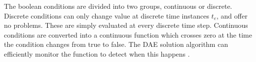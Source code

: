 \documentclass[\rootfolder/main.tex]{subfiles}
\begin{document}
The boolean conditions are divided into two groups, continuous or discrete.
Discrete conditions can only change value at discrete time instances $t_{e}$, and offer no problems.
These are simply evaluated at every discrete time step.
Continuous conditions are converted into a continuous function which crosses zero at the time the condition changes from true to false.
The DAE solution algorithm can efficiently monitor the function to detect when this happens \cite{openmodelica.org:lundvall:sims:2005}.
\end{document}
